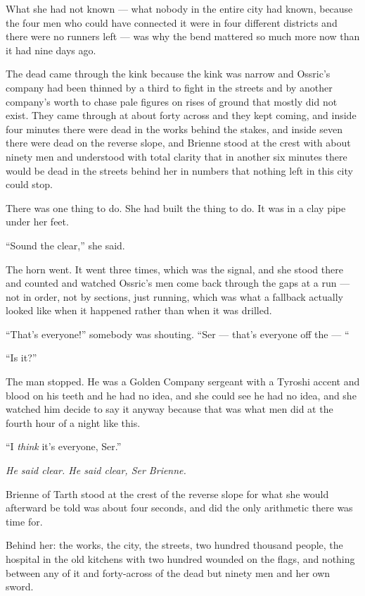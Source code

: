 What she had not known — what nobody in the entire city had known, because the four men who could have connected it were in four different districts and there were no runners left — was why the bend mattered so much more now than it had nine days ago.

The dead came through the kink because the kink was narrow and Ossric’s company had been thinned by a third to fight in the streets and by another company’s worth to chase pale figures on rises of ground that mostly did not exist. They came through at about forty across and they kept coming, and inside four minutes there were dead in the works behind the stakes, and inside seven there were dead on the reverse slope, and Brienne stood at the crest with about ninety men and understood with total clarity that in another six minutes there would be dead in the streets behind her in numbers that nothing left in this city could stop.

There was one thing to do. She had built the thing to do. It was in a clay pipe under her feet.

“Sound the clear,” she said.

The horn went. It went three times, which was the signal, and she stood there and counted and watched Ossric’s men come back through the gaps at a run — not in order, not by sections, just running, which was what a fallback actually looked like when it happened rather than when it was drilled.

“That’s everyone!” somebody was shouting. “Ser — that’s everyone off the — “

“Is it?”

The man stopped. He was a Golden Company sergeant with a Tyroshi accent and blood on his teeth and he had no idea, and she could see he had no idea, and she watched him decide to say it anyway because that was what men did at the fourth hour of a night like this.

“I \textit{think} it’s everyone, Ser.”

\textit{He said clear. He said clear, Ser Brienne.}

Brienne of Tarth stood at the crest of the reverse slope for what she would afterward be told was about four seconds, and did the only arithmetic there was time for.

Behind her: the works, the city, the streets, two hundred thousand people, the hospital in the old kitchens with two hundred wounded on the flags, and nothing between any of it and forty-across of the dead but ninety men and her own sword.

